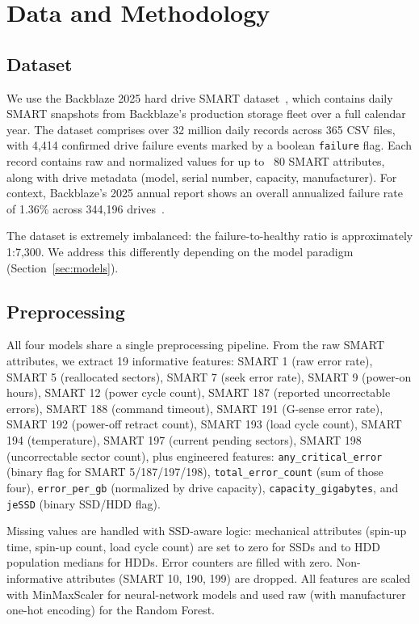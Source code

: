 \documentclass[sigconf,natbib=false, language=english]{acmart}
\begin{document}
\section{Data and Methodology}
\label{sec:method}

\subsection{Dataset}
\label{sec:dataset}

We use the Backblaze 2025 hard drive SMART dataset~\cite{backblaze2025}, which contains daily SMART snapshots from Backblaze's production storage fleet over a full calendar year. The dataset comprises over 32 million daily records across 365 CSV files, with 4{,}414 confirmed drive failure events marked by a boolean \texttt{failure} flag. Each record contains raw and normalized values for up to ~80 SMART attributes, along with drive metadata (model, serial number, capacity, manufacturer). For context, Backblaze's 2025 annual report shows an overall annualized failure rate of 1.36\% across 344{,}196 drives~\cite{backblaze2025stats}.

The dataset is extremely imbalanced: the failure-to-healthy ratio is approximately 1:7{,}300. We address this differently depending on the model paradigm (Section~\ref{sec:models}).

\subsection{Preprocessing}
\label{sec:preprocessing}

All four models share a single preprocessing pipeline. From the raw SMART attributes, we extract 19 informative features: SMART 1 (raw error rate), SMART 5 (reallocated sectors), SMART 7 (seek error rate), SMART 9 (power-on hours), SMART 12 (power cycle count), SMART 187 (reported uncorrectable errors), SMART 188 (command timeout), SMART 191 (G-sense error rate), SMART 192 (power-off retract count), SMART 193 (load cycle count), SMART 194 (temperature), SMART 197 (current pending sectors), SMART 198 (uncorrectable sector count), plus engineered features: \texttt{any\_critical\_error} (binary flag for SMART 5/187/197/198), \texttt{total\_error\_count} (sum of those four), \texttt{error\_per\_gb} (normalized by drive capacity), \texttt{capacity\_gigabytes}, and \texttt{jeSSD} (binary SSD/HDD flag).

Missing values are handled with SSD-aware logic: mechanical attributes (spin-up time, spin-up count, load cycle count) are set to zero for SSDs and to HDD population medians for HDDs. Error counters are filled with zero. Non-informative attributes (SMART 10, 190, 199) are dropped. All features are scaled with MinMaxScaler for neural-network models and used raw (with manufacturer one-hot encoding) for the Random Forest.
\end{document}
